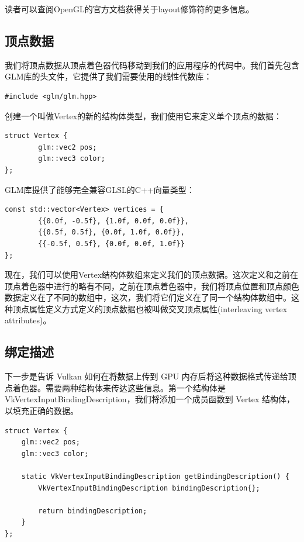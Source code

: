 \documentclass{ctexart}
\begin{document}
读者可以查阅OpenGL的官方文档获得关于layout修饰符的更多信息。

\subsection{顶点数据}

我们将顶点数据从顶点着色器代码移动到我们的应用程序的代码中。我们首先包含GLM库的头文件，它提供了我们需要使用的线性代数库：

\begin{lstlisting}[language={[ANSI]C}]
#include <glm/glm.hpp>
\end{lstlisting}

创建一个叫做Vertex的新的结构体类型，我们使用它来定义单个顶点的数据：

\begin{lstlisting}[language={[ANSI]C}]
struct Vertex {
		glm::vec2 pos;
		glm::vec3 color;
};
\end{lstlisting}

GLM库提供了能够完全兼容GLSL的C++向量类型：

\begin{lstlisting}[language={[ANSI]C}]
const std::vector<Vertex> vertices = {
		{{0.0f, -0.5f}, {1.0f, 0.0f, 0.0f}},
		{{0.5f, 0.5f}, {0.0f, 1.0f, 0.0f}},
		{{-0.5f, 0.5f}, {0.0f, 0.0f, 1.0f}}
};
\end{lstlisting}

现在，我们可以使用Vertex结构体数组来定义我们的顶点数据。这次定义和之前在顶点着色器中进行的略有不同，之前在顶点着色器中，我们将顶点位置和顶点颜色数据定义在了不同的数组中，这次，我们将它们定义在了同一个结构体数组中。这种顶点属性定义方式定义的顶点数据也被叫做交叉顶点属性(interleaving vertex attributes)。

\subsection{绑定描述}

下一步是告诉 Vulkan 如何在将数据上传到 GPU 内存后将这种数据格式传递给顶点着色器。需要两种结构体来传达这些信息。第一个结构体是 VkVertexInputBindingDescription，我们将添加一个成员函数到 Vertex 结构体，以填充正确的数据。
\begin{lstlisting}[language={[ANSI]C}]
struct Vertex {
	glm::vec2 pos;
	glm::vec3 color;

	static VkVertexInputBindingDescription getBindingDescription() {
		VkVertexInputBindingDescription bindingDescription{};

		return bindingDescription;
	}
};
\end{lstlisting}
\end{document}
